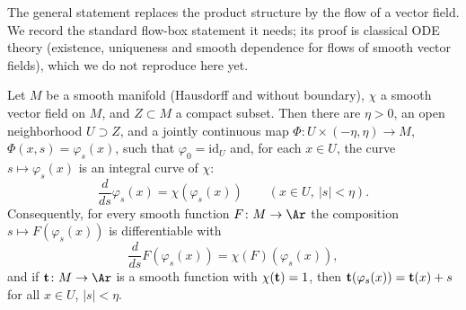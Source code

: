 The general statement replaces the product structure by the flow of a
vector field. We record the standard flow-box statement it needs;
its proof is classical ODE theory (existence, uniqueness and smooth
dependence for flows of smooth vector fields), which we do not
reproduce here yet.

\begin{lemma}
\label{lem:vector-field-flow-near-compact}
\leanok
Let $M$ be a smooth manifold (Hausdorff and without boundary), $\chi$ a
smooth vector field on $M$, and $Z\subset M$ a compact subset. Then there
are $\eta>0$, an open neighborhood $U\supset Z$, and a jointly continuous
map $\Phi\colon U\times(-\eta,\eta)\to M$, $\Phi(x,s)=\varphi_s(x)$, such
that $\varphi_0=\mathrm{id}_U$ and, for each $x\in U$, the curve
$s\mapsto\varphi_s(x)$ is an integral curve of $\chi$:
$$\frac{d}{ds}\varphi_s(x)=\chi(\varphi_s(x))\qquad(x\in U,\ |s|<\eta).$$
Consequently, for every smooth function $F\colon M\to\Ar$ the composition
$s\mapsto F(\varphi_s(x))$ is differentiable with
$$\frac{d}{ds}F(\varphi_s(x))=\chi(F)\left(\varphi_s(x)\right),$$
and if ${\bf t}\colon M\to\Ar$ is a smooth function with $\chi({\bf t})=1$,
then ${\bf t}(\varphi_s(x))={\bf t}(x)+s$ for all $x\in U$, $|s|<\eta$.
\end{lemma}

